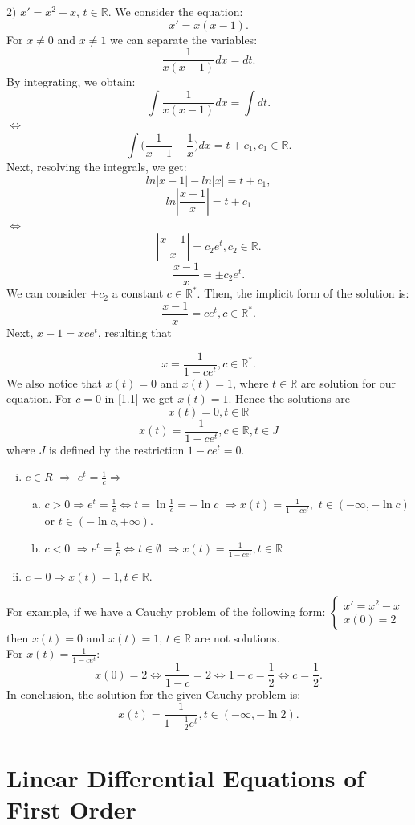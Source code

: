 \documentclass[a4paper,11pt]{report}
\newcommand{\R}{\mathbb{R}}
\begin{document}
$2)$ $x'=x^{2}-x$, $t\in \R.$ We consider the equation: $$x'=x(x-1).$$ For $x\neq0$ and $x\neq1$ we can separate the variables: $$\frac{1}{x(x-1)}dx=dt.$$ By integrating, we obtain: $$\int \frac{1}{x(x-1)} dx = \int dt.$$ $\Leftrightarrow$ $$\int \bigg(\frac{1}{x-1}-\frac{1}{x}\bigg)dx=t+c_{1}, c_{1} \in \R.$$ Next, resolving the integrals, we get:
$$ln|x-1|-ln|x|=t+c_{1},$$ $$ln|\frac{x-1}{x}|=t+c_{1}$$ $\Leftrightarrow$ $$|\frac{x-1}{x}|=c_{2}e^{t}, c_{2} \in \R.$$ $$\frac{x-1}{x}=\pm c_{2} e^{t}.$$ We can consider $\pm c_{2}$ a constant $c \in \R^{*}$. Then, the implicit form of the solution is: $$\frac{x-1}{x}=ce^{t}, c\in \R^{*}.$$ Next, $x-1=xce^{t}$, resulting that 

\begin{equation}
x=\frac{1}{1-ce^{t}}, c\in \R^{*}.
\end{equation}
We also notice that $x(t)=0$ and $x(t)=1$, where $t\in \R$ are solution for our equation. For $c=0$ in \eqref{1.1} we get $x(t)=1$. Hence the solutions are $$x(t)=0, t\in\R$$ $$x(t)=\frac{1}{1-ce^{t}}, c\in \R, t\in J$$ where $J$ is defined by the restriction $1-ce^{t}=0$.
\begin{enumerate}[(i)]
 \item $c \in R$ $\Rightarrow$ $e^{t}=\frac{1}{c}\Rightarrow$
 \begin{enumerate}[(a)]
  \item $c>0\Rightarrow e^{t}=\frac{1}{c} \Leftrightarrow t=\ln{\frac{1}{c}}=-\ln {c}$ $\Rightarrow x(t)=\frac{1}{1-ce^{t}},$ $t\in (-\infty,-\ln{c})$ or $t\in (-\ln{c},+\infty)$.
  \item $c<0$ $\Rightarrow e^{t}=\frac{1}{c} \Leftrightarrow t\in \emptyset$ $\Rightarrow x(t)=\frac{1}{1-ce^{t}}, t\in \R$
 \end{enumerate}
 \item $c=0 \Rightarrow x(t)=1, t\in \R.$
\end{enumerate}
For example, if we have a Cauchy problem of the following form:
$\begin{cases}
  x'=x^{2}-x\\
  x(0)=2
 \end{cases}
$
then $x(t)=0$ and $x(t)=1$, $t\in \R$ are not solutions.\\
For $x(t)=\frac{1}{1-ce^{t}}$: $$x(0)=2 \Leftrightarrow \frac{1}{1-c}=2 \Leftrightarrow 1-c=\frac{1}{2} \Leftrightarrow c=\frac{1}{2}.$$ In conclusion, the solution for the given Cauchy problem is:$$x(t)=\frac{1}{1-\frac{1}{2}e^{t}}, t\in (-\infty,-\ln{2}).$$


\section{Linear Differential Equations of First Order}
\end{document}
